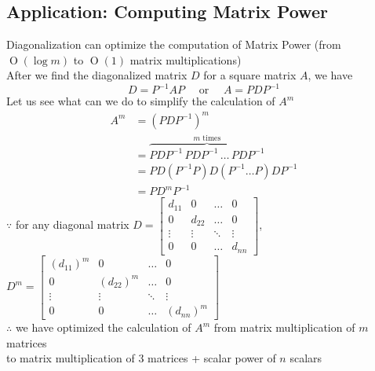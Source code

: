 \documentclass[11pt]{article}
\newcommand{\mymat}[1]{#1}
\begin{document}
    \subsection{Application: Computing Matrix Power}
    Diagonalization can optimize the computation of Matrix Power (from $\operatorname{O}(\log m)$ to $\operatorname{O}(1)$ matrix multiplications) \vspace{1ex} \\
    After we find the diagonalized matrix $\mymat{D}$ for a square matrix $\mymat{A}$, we have
    \begin{equation*}
        \mymat{D} = \mymat{P}^{-1} \mymat{A} \mymat{P} \quad\text{ or }\quad \mymat{A} = \mymat{P} \mymat{D} \mymat{P}^{-1}
    \end{equation*}
    Let us see what can we do to simplify the calculation of $\mymat{A}^m$
    \begin{align*}
        \mymat{A}^m &= (\mymat{P} \mymat{D} \mymat{P}^{-1})^m \\
        &= \overbrace{\mymat{P} \mymat{D} \mymat{P}^{-1}\,\mymat{P} \mymat{D} \mymat{P}^{-1}\,\dots\,\mymat{P} \mymat{D} \mymat{P}^{-1}}^{m\text{ times}} \\
        &= \mymat{P} \mymat{D} (\mymat{P}^{-1}\mymat{P}) \mymat{D} (\mymat{P}^{-1} \dots \mymat{P})\mymat{D}\mymat{P}^{-1} \\
        &= \mymat{P} \mymat{D}^m \mymat{P}^{-1}
    \end{align*}
    $\because$ for any diagonal matrix $\mymat{D} = \begin{bmatrix}
            d_{11}  & 0         & \dots     & 0 \\
            0       & d_{22}    & \dots     & 0 \\
            \vdots  & \vdots    & \ddots    & \vdots \\
            0       & 0         & \dots     & d_{nn}
        \end{bmatrix}$, $\mymat{D}^m = \begin{bmatrix}
            (d_{11})^m  & 0             & \dots     & 0 \\
            0           & (d_{22})^m    & \dots     & 0 \\
            \vdots      & \vdots        & \ddots    & \vdots \\
            0           & 0             & \dots     & (d_{nn})^m
        \end{bmatrix}$\\
    $\therefore$ we have optimized the calculation of $\mymat{A}^m$ from matrix multiplication of $m$ matrices \\
    to matrix multiplication of 3 matrices + scalar power of $n$ scalars
\end{document}
